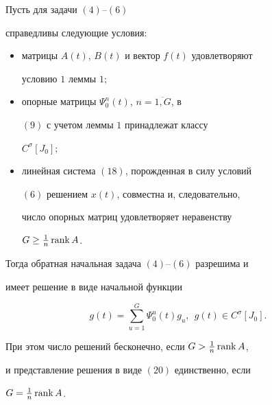 \begin{thm}


Пусть для задачи $(4)$--$(6)$


справедливы следующие условия\/${:}$


\begin{itemize}


\item[1.] матрицы $A(t)$, $B(t)$ и вектор $f(t)$ удовлетворяют


условию $1$ леммы $1;$


\item[2.] опорные матрицы $\Psi^n_0(t)$, $n=\overline{1,G}$, в


$(9)$ с учетом леммы $1$ принадлежат классу


$C^{\sigma}[J_0];$


\item[3.] линейная система $(18)$, порожденная в силу условий


$(6)$ решением $x(t)$, совместна и, следовательно,


число опорных матриц удовлетворяет неравенству


$G\geq \frac{1}{n}\operatorname{rank} A$.


\end{itemize}





Тогда обратная начальная задача $(4)$--$(6)$ разрешима и


имеет решение в виде начальной функции


\begin{equation}


g(t)=\sum_{u=1}^G\Psi^u_0(t)g_u,\ \ g(t)\in C^{\sigma}[J_0].


\end{equation}


При этом число решений бесконечно, если $G>\frac{1}{n}\operatorname{rank} A$,


и представление решения в виде $(20)$ единственно, если 


$G=\frac{1}{n}\operatorname{rank} A$.


\end{thm}





